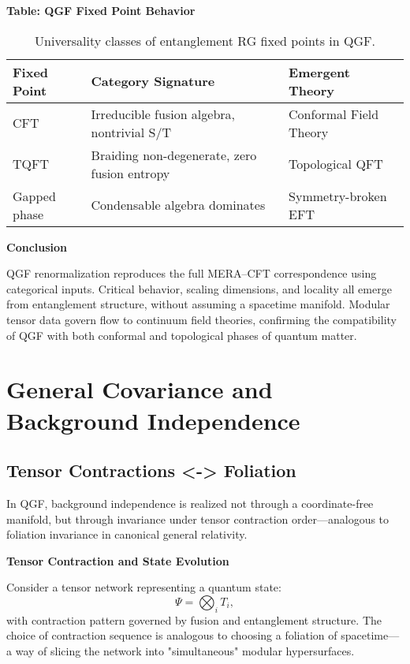 \documentclass[11pt]{article}
\def\texorpdfstring#1#2{#2}
\begin{document}
\vspace{0.5em}
\noindent\textbf{Table: QGF Fixed Point Behavior}

\begin{table}[H]
\centering
\renewcommand{\arraystretch}{1.2}
\begin{tabular}{|l|l|l|}
\hline
\textbf{Fixed Point} & \textbf{Category Signature} & \textbf{Emergent Theory} \\
\hline
CFT & Irreducible fusion algebra, nontrivial S/T & Conformal Field Theory \\
TQFT & Braiding non-degenerate, zero fusion entropy & Topological QFT \\
Gapped phase & Condensable algebra dominates & Symmetry-broken EFT \\
\hline
\end{tabular}
\caption{Universality classes of entanglement RG fixed points in QGF.}
\label{tab:qgf-fixedpoints}
\end{table}

\vspace{0.5em}
\noindent\textbf{Conclusion}

QGF renormalization reproduces the full MERA–CFT correspondence using categorical inputs. Critical behavior, scaling dimensions, and locality all emerge from entanglement structure, without assuming a spacetime manifold. Modular tensor data govern flow to continuum field theories, confirming the compatibility of QGF with both conformal and topological phases of quantum matter.


\section{General Covariance and Background Independence}

\subsection{\texorpdfstring{Tensor Contractions \( \leftrightarrow \) Foliation}{Tensor Contractions <-> Foliation}}


In QGF, background independence is realized not through a coordinate-free manifold, but through invariance under tensor contraction order—analogous to foliation invariance in canonical general relativity.

\vspace{0.5em}
\noindent\textbf{Tensor Contraction and State Evolution}

Consider a tensor network representing a quantum state:
\[
\Psi = \bigotimes_i T_i,
\]
with contraction pattern governed by fusion and entanglement structure. The choice of contraction sequence is analogous to choosing a foliation of spacetime—a way of slicing the network into "simultaneous" modular hypersurfaces.
\end{document}
